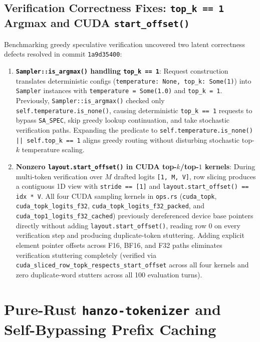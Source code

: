 \documentclass[11pt,a4paper]{article}
\begin{document}
\subsection{Verification Correctness Fixes: \texttt{top\_k == 1} Argmax and CUDA \texttt{start\_offset()}}
Benchmarking greedy speculative verification uncovered two latent correctness defects resolved in commit \texttt{1a9d35400}:
\begin{enumerate}[noitemsep]
  \item \textbf{\texttt{Sampler::is\_argmax()} handling \texttt{top\_k == 1}}: Request construction translates deterministic configs (\texttt{temperature: None, top\_k: Some(1)}) into \texttt{Sampler} instances with \texttt{temperature = Some(1.0)} and \texttt{top\_k = 1}. Previously, \texttt{Sampler::is\_argmax()} checked only \texttt{self.temperature.is\_none()}, causing deterministic \texttt{top\_k == 1} requests to bypass \texttt{SA\_SPEC}, skip greedy lookup continuation, and take stochastic verification paths. Expanding the predicate to \texttt{self.temperature.is\_none() || self.top\_k == 1} aligns greedy routing without disturbing stochastic top-$k$ temperature scaling.
  \item \textbf{Nonzero \texttt{layout.start\_offset()} in CUDA top-$k$/top-$1$ kernels}: During multi-token verification over $M$ drafted logits \texttt{[1, M, V]}, row slicing produces a contiguous 1D view with \texttt{stride == [1]} and \texttt{layout.start\_offset() == idx * V}. All four CUDA sampling kernels in \texttt{ops.rs} (\texttt{cuda\_topk}, \texttt{cuda\_topk\_logits\_f32}, \texttt{cuda\_topk\_logits\_f32\_packed}, and \texttt{cuda\_top1\_logits\_f32\_cached}) previously dereferenced device base pointers directly without adding \texttt{layout.start\_offset()}, reading row $0$ on every verification step and producing duplicate-token stuttering. Adding explicit element pointer offsets across F16, BF16, and F32 paths eliminates verification stuttering completely (verified via \texttt{cuda\_sliced\_row\_topk\_respects\_start\_offset} across all four kernels and zero duplicate-word stutters across all 100 evaluation turns).
\end{enumerate}

\section{Pure-Rust \texttt{hanzo-tokenizer} and Self-Bypassing Prefix Caching}
\end{document}
